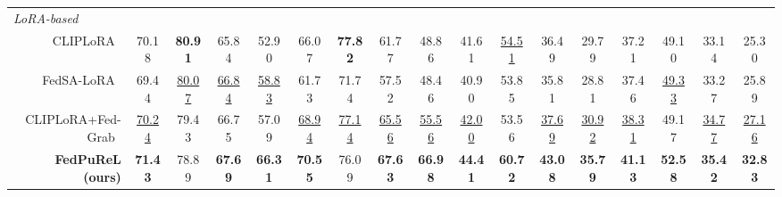 \documentclass[10pt,twocolumn,letterpaper]{article}
\newcommand{\blueup}[1]{\textcolor{RoyalBlue}{$\uparrow$ #1}}
\newcommand{\reddown}[1]{\textcolor{OrangeRed}{$\downarrow$ #1}}
\begin{document}
\begin{table}[t]
\begin{tabular}{r||cccc|cccc|cccc|cccc}



\hline
\multicolumn{17}{l}{\textcolor{gray!60}{\textit{LoRA-based}}} \\
\cellcolor{gray!10}
CLIPLoRA~\cite{cliplora}
 & \cellcolor{gray!10}70.18 & \cellcolor{gray!10}\textbf{80.91} & \cellcolor{gray!10}65.84 & \cellcolor{gray!10}52.90
 & \cellcolor{gray!10}66.07 & \cellcolor{gray!10}\textbf{77.82} & \cellcolor{gray!10}61.77 & \cellcolor{gray!10}48.86
 & \cellcolor{gray!10}41.61 & \cellcolor{gray!10}\underline{54.51} & \cellcolor{gray!10}36.49 & \cellcolor{gray!10}29.79
 & \cellcolor{gray!10}37.21 & \cellcolor{gray!10}49.10 & \cellcolor{gray!10}33.14 & \cellcolor{gray!10}25.30 \\

FedSA-LoRA~\cite{wang2024fedsalora}
 & 69.44 & \underline{80.07} & \underline{66.84} & \underline{58.83}
 & 61.73 & 71.74 & 57.52 & 48.46
 & 40.90 & 53.85 & 35.81 & 28.81
 & 37.46 & \underline{49.33} & 33.27 & 25.89 \\

\cellcolor{gray!10}
 CLIPLoRA+Fed-Grab~\cite{Fed-Grab}
 & \cellcolor{gray!10}\underline{70.24} & \cellcolor{gray!10}79.43 & \cellcolor{gray!10}66.75 & \cellcolor{gray!10}57.09
 & \cellcolor{gray!10}\underline{68.94} & \cellcolor{gray!10}\underline{77.14} & \cellcolor{gray!10}\underline{65.56} & \cellcolor{gray!10}\underline{55.56}
 & \cellcolor{gray!10}\underline{42.00} & \cellcolor{gray!10}53.56 & \cellcolor{gray!10}\underline{37.69} & \cellcolor{gray!10}\underline{30.92}
 & \cellcolor{gray!10}\underline{38.31} & \cellcolor{gray!10}49.17 & \cellcolor{gray!10}\underline{34.77} & \cellcolor{gray!10}\underline{27.16} \\

\cellcolor[HTML]{D7F6FF}\textbf{FedPuReL (ours)}
 & \cellcolor[HTML]{D7F6FF}\textbf{71.43} & \cellcolor[HTML]{D7F6FF}78.89 & \cellcolor[HTML]{D7F6FF}\textbf{67.69} & \cellcolor[HTML]{D7F6FF}\textbf{66.31}
 & \cellcolor[HTML]{D7F6FF}\textbf{70.55} & \cellcolor[HTML]{D7F6FF}76.09 & \cellcolor[HTML]{D7F6FF}\textbf{67.63} & \cellcolor[HTML]{D7F6FF}\textbf{66.98}
 & \cellcolor[HTML]{D7F6FF}\textbf{44.41} & \cellcolor[HTML]{D7F6FF}\textbf{60.72} & \cellcolor[HTML]{D7F6FF}\textbf{43.08} & \cellcolor[HTML]{D7F6FF}\textbf{35.79}
 & \cellcolor[HTML]{D7F6FF}\textbf{41.13} & \cellcolor[HTML]{D7F6FF}\textbf{52.58} & \cellcolor[HTML]{D7F6FF}\textbf{35.42} & \cellcolor[HTML]{D7F6FF}\textbf{32.83} \\


\end{tabular}
\end{table}
\end{document}

